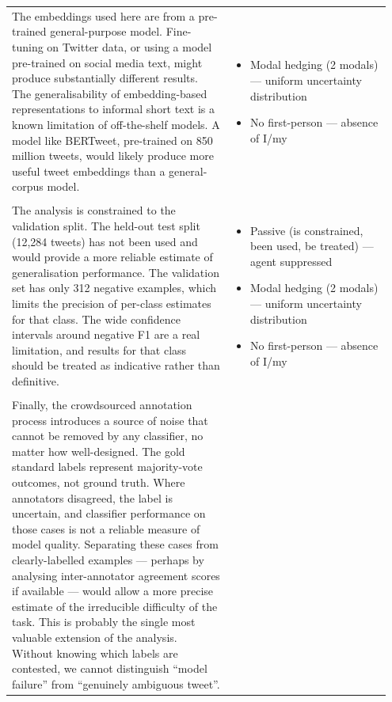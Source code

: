 \documentclass[11pt]{article}
\begin{document}
\begin{longtable}{|p{0.55\linewidth}|p{0.40\linewidth}|}
\hline
\rule[-3.5cm]{0pt}{3.5cm} & \\
\hline
The embeddings used here are from a pre-trained general-purpose model. Fine-tuning on Twitter data, or using a model pre-trained on social media text, might produce substantially different results. The generalisability of embedding-based representations to informal short text is a known limitation of off-the-shelf models. A model like BERTweet, pre-trained on 850 million tweets, would likely produce more useful tweet embeddings than a general-corpus model. & \begin{itemize}[leftmargin=1em,itemsep=1pt,topsep=1pt,parsep=0pt]
  \item Modal hedging (2 modals) --- uniform uncertainty distribution
  \item No first-person --- absence of I/my
\end{itemize} \\[2pt]
\hline
\rule[-3.5cm]{0pt}{3.5cm} & \\
\hline
The analysis is constrained to the validation split. The held-out test split (12,284 tweets) has not been used and would provide a more reliable estimate of generalisation performance. The validation set has only 312 negative examples, which limits the precision of per-class estimates for that class. The wide confidence intervals around negative F1 are a real limitation, and results for that class should be treated as indicative rather than definitive. & \begin{itemize}[leftmargin=1em,itemsep=1pt,topsep=1pt,parsep=0pt]
  \item Passive (is constrained, been used, be treated) --- agent suppressed
  \item Modal hedging (2 modals) --- uniform uncertainty distribution
  \item No first-person --- absence of I/my
\end{itemize} \\[2pt]
\hline
\rule[-3.5cm]{0pt}{3.5cm} & \\
\hline
Finally, the crowdsourced annotation process introduces a source of noise that cannot be removed by any classifier, no matter how well-designed. The gold standard labels represent majority-vote outcomes, not ground truth. Where annotators disagreed, the label is uncertain, and classifier performance on those cases is not a reliable measure of model quality. Separating these cases from clearly-labelled examples --- perhaps by analysing inter-annotator agreement scores if available --- would allow a more precise estimate of the irreducible difficulty of the task. This is probably the single most valuable extension of the analysis. Without knowing which labels are contested, we cannot distinguish ``model failure'' from ``genuinely ambiguous tweet''. & \begin{itemize}[leftmargin=1em,itemsep=1pt,topsep=1pt,parsep=0pt]

\end{itemize}
\end{longtable}
\end{document}
